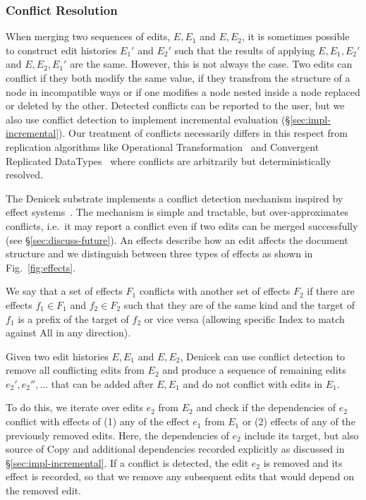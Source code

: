 \documentclass[sigconf,anonymous,screen]{acmart}
\newcommand{\ident}[1]{{\sffamily #1}}
\begin{document}
\subsubsection*{Conflict Resolution}
When merging two sequences of edits, $E, E_1$ and $E, E_2$, it is sometimes possible to construct
edit histories $E_1'$ and $E_2'$ such that the results of applying $E, E_1, E_2'$ and
$E, E_2, E_1'$ are the same. However, this is not always the case. Two edits can conflict if
they both modify the same value, if they transfrom the structure of a node in incompatible ways
or if one modifies a node nested inside a node replaced or deleted by the other.
Detected conflicts can be reported to the user, but we also use conflict detection to
implement incremental evaluation (\S\ref{sec:impl-incremental}).
Our treatment of conflicts necessarily differs in this respect from replication algorithms like Operational Transformation~\cite{OT} and Convergent Replicated DataTypes~\cite{CRDT} where conflicts are arbitrarily but deterministically resolved.

The Denicek substrate implements a conflict detection mechanism inspired by effect
systems~\cite{lucassen-1988-effects}. The mechanism is simple and tractable, but over-approximates
conflicts, i.e.~it may report a conflict even if two edits can be merged successfully
(see \S\ref{sec:discuss-future}). An effects describe how an edit affects the document structure
and we distinguish between three types of effects as shown in Fig.~\ref{fig:effects}.

We say that a set of effects $F_1$ conflicts with another set of effects $F_2$ if there
are effects $f_1\in F_1$ and $f_2\in F_2$ such that they are of the same kind and the target
of $f_1$ is a prefix of the target of $f_2$ or vice versa (allowing specific \ident{Index} to
match against \ident{All} in any direction).

Given two edit histories $E, E_1$ and $E, E_2$, Denicek can use conflict detection to remove
all conflicting edits from $E_2$ and produce a sequence of remaining edits $e_2', e_2'', \ldots$
that can be added after $E, E_1$ and do not conflict with edits in $E_1$.

To do this, we iterate over edits $e_2$ from $E_2$ and check if the dependencies of $e_2$
conflict with effects of (1) any of the effect $e_1$ from $E_1$ or (2) effects of any of the
previously removed edits. Here, the dependencies of $e_2$ include its target, but also source
of \ident{Copy} and additional dependencies recorded explicitly as discussed in
\S\ref{sec:impl-incremental}. If a conflict is detected, the edit $e_2$ is removed and its effect
is recorded, so that we remove any subsequent edits that would depend on the removed edit.
\end{document}
